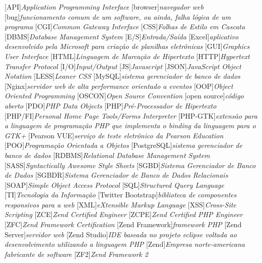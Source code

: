 
			[API]{\textit{Application Programming Interface}}
		[browser]{\textit{navegador web}}
			[bug]{\textit{funcionamento comum de um software, ou ainda, falha
lógica de um programa}}
			[CGI]{\textit{Common Gateway Interface }}
			[CSS]{\textit{Folhas de Estilo em Cascata}}
			[DBMS]{\textit{Database Management System}}
			[E/S]{\textit{Entrada/Saída}}
		[Excel]{\textit{aplicativo desenvolvido pela Microsoft para
criação de planilhas eletrônicas}}
			[GUI]{\textit{Graphics User Interface}}
			[HTML]{\textit{Linguagem de Marcação de Hipertexto}}
			[HTTP]{\textit{Hypertext Transfer Protocol}}
			[I/O]{\textit{Input/Output}}
			[JS]{\textit{Javascript}}
			[JSON]{\textit{JavaScript Object Notation}}
			[LESS]{\textit{Leaner CSS}}
		[MySQL]{\textit{sistema gerenciador de banco de dados}}
		[Nginx]{\textit{servidor web de alta performance orientado a
eventos}}
			[OOP]{\textit{Object Oriented Programming}}
		[OSCON]{\textit{Open Source Convention}}
	[open source]{\textit{código aberto}}
			[PDO]{\textit{‎PHP Data Objects}}
			[PHP]{\textit{Pré-Processador de Hipertexto}}
		[PHP/FI]{\textit{Personal Home Page Tools/Forms Interpreter}}
		[PHP-GTK]{\textit{extensão para a linguagem de programação PHP
que implementa o binding da linguagem para o GTK+}}
	[Pearson VUE]{\textit{serviço de teste eletrônico da Pearson Education}}
			[POO]{\textit{Programação Orientada a Objetos}}
	[PostgreSQL]{\textit{sistema gerenciador de banco de dados}}
		[RDBMS]{\textit{Relational Database Management System}}
			[SASS]{\textit{Syntactically Awesome Style Sheets}}
			[SGBD]{\textit{Sistema Gerenciador de Banco de Dados}}
			[SGBDR]{\textit{Sistema Gerenciador de Banco de Dados
Relacionais}}
			[SOAP]{\textit{Simple Object Access Protocol}}
			[SQL]{\textit{Structured Query Language}}
			[TI]{\textit{Tecnologia da Informação}}
[Twitter Bootstrap]{\textit{biblioteca de
componentes responsivos para a web}}
			[XML]{\textit{eXtensible Markup Language}}
			[XSS]{\textit{Cross-Site Scripting}}
			[ZCE]{\textit{Zend Certified Engineer}}
			[ZCPE]{\textit{Zend Certified PHP Engineer}}
			[ZFC]{\textit{Zend Framework Certification}}
[Zend Framework]{\textit{framework PHP}}
	[Zend Server]{\textit{servidor web}}
	[Zend Studio]{\textit{IDE baseada no projeto eclipse voltada
ao desenvolvimento utilizando a linguagem PHP}}
			[Zend]{\textit{Empresa norte-americana fabricante de software}}
			[ZF2]{\textit{Zend Framework 2}}